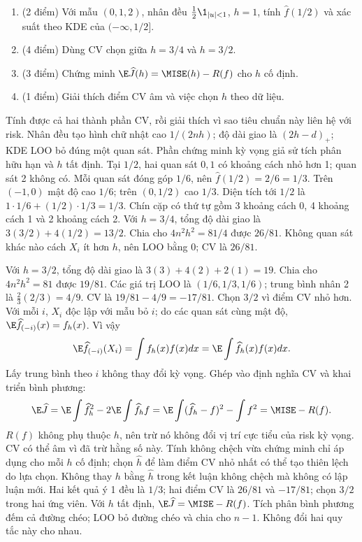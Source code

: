 \begin{problem}
\begin{enumerate}
\item (2 điểm) Với mẫu $(0,1,2)$, nhân đều $\frac12\1_{|u|<1}$, $h=1$, tính $\widehat f(1/2)$ và xác suất theo KDE của $(-\infty,1/2]$.
\item (4 điểm) Dùng CV chọn giữa $h=3/4$ và $h=3/2$.
\item (3 điểm) Chứng minh $\E\widehat J(h)=\MISE(h)-R(f)$ cho $h$ cố định.
\item (1 điểm) Giải thích điểm CV âm và việc chọn $h$ theo dữ liệu.
\end{enumerate}
\end{problem}
\begin{solution}
Tính được cả hai thành phần CV, rồi giải thích vì sao tiêu chuẩn này liên hệ với risk.
Nhân đều tạo hình chữ nhật cao $1/(2nh)$; độ dài giao là $(2h-d)_+$; KDE LOO bỏ đúng một quan sát. Phần chứng minh kỳ vọng giả sử tích phân hữu hạn và $h$ tất định.
Tại $1/2$, hai quan sát $0,1$ có khoảng cách nhỏ hơn 1; quan sát 2 không có. Mỗi quan sát đóng góp $1/6$, nên $\widehat f(1/2)=2/6=1/3$.
Trên $(-1,0)$ mật độ cao $1/6$; trên $(0,1/2)$ cao $1/3$. Diện tích tới $1/2$ là $1\cdot1/6+(1/2)\cdot1/3=1/3$.
Chín cặp có thứ tự gồm 3 khoảng cách 0, 4 khoảng cách 1 và 2 khoảng cách 2.
Với $h=3/4$, tổng độ dài giao là $3(3/2)+4(1/2)=13/2$. Chia cho $4n^2h^2=81/4$ được $26/81$. Không quan sát khác nào cách $X_i$ ít hơn $h$, nên LOO bằng 0; CV là $26/81$.

Với $h=3/2$, tổng độ dài giao là $3(3)+4(2)+2(1)=19$. Chia cho $4n^2h^2=81$ được $19/81$. Các giá trị LOO là $(1/6,1/3,1/6)$; trung bình nhân 2 là $\frac23(2/3)=4/9$. CV là $19/81-4/9=-17/81$. Chọn $3/2$ vì điểm CV nhỏ hơn.
Với mỗi $i$, $X_i$ độc lập với mẫu bỏ $i$; do các quan sát cùng mật độ, $\E\widehat f_{(-i)}(x)=f_h(x)$. Vì vậy
\[
 \E\widehat f_{(-i)}(X_i)=\int f_h(x)f(x)dx
 =\E\int\widehat f_h(x)f(x)dx.
\]
Lấy trung bình theo $i$ không thay đổi kỳ vọng. Ghép vào định nghĩa CV và khai triển bình phương:
\[
 \E\widehat J=\E\int\widehat f_h^2-2\E\int\widehat f_hf
 =\E\int(\widehat f_h-f)^2-\int f^2=\MISE-R(f).
\]
$R(f)$ không phụ thuộc $h$, nên trừ nó không đổi vị trí cực tiểu của risk kỳ vọng. CV có thể âm vì đã trừ hằng số này.
Tính không chệch vừa chứng minh chỉ áp dụng cho mỗi $h$ cố định; chọn $\widehat h$ để làm điểm CV nhỏ nhất có thể tạo thiên lệch do lựa chọn. Không thay $h$ bằng $\widehat h$ trong kết luận không chệch mà không có lập luận mới.
Hai kết quả ý 1 đều là $1/3$; hai điểm CV là $26/81$ và $-17/81$; chọn $3/2$ trong hai ứng viên. Với $h$ tất định, $\E\widehat J=\MISE-R(f)$.
Tích phân bình phương đếm cả đường chéo; LOO bỏ đường chéo và chia cho $n-1$. Không đổi hai quy tắc này cho nhau.
\end{solution}


